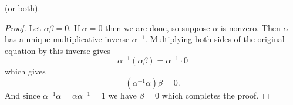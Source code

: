 \begin{enumerate}
  (or both).
  \begin{proof}
    Let $\alpha\beta = 0$. If $\alpha = 0$ then we are done, so
    suppose $\alpha$ is nonzero. Then $\alpha$ has a unique
    multiplicative inverse $\alpha^{-1}$. Multiplying both sides of
    the original equation by this inverse gives
    \begin{equation*}
      \alpha^{-1}(\alpha\beta) = \alpha^{-1}\cdot0
    \end{equation*}
    which gives
    \begin{equation*}
      (\alpha^{-1}\alpha)\beta = 0.
    \end{equation*}
    And since $\alpha^{-1}\alpha = \alpha\alpha^{-1} = 1$ we have
    $\beta = 0$ which completes the proof.
  \end{proof}
\end{enumerate}
